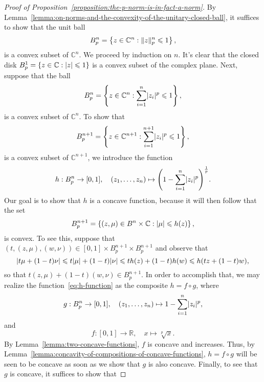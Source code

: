 \begin{proof}[Proof of Proposition~\ref{proposition:the-p-norm-is-in-fact-a-norm}]
  By Lemma~\ref{lemma:on-norms-and-the-convexity-of-the-unitary-closed-ball},
  it suffices to show that the unit ball
  \[
    B^{n}_{p}
    =
    \left\{z\in\mathbb{C}^{n}:\lVert z\rVert^{n}_{p}\leqslant{1}\right\},
  \]
  is a convex subset of \(\mathbb{C}^{n}\). We proceed by induction on
  \(n\). It's clear that the closed disk
  \(B^{1}_{p}=\left\{z\in\mathbb{C}:\lvert z\rvert\leqslant{1}\right\}\) is a
  convex subset of the complex plane. Next, suppose that the ball
  \[
    B^{n}_{p}
    =
    \left\{z\in\mathbb{C}^{n}:\sum_{i=1}^{n}\lvert z_{i}\rvert^{p}\leqslant{1}\right\},
  \]
  is a convex subset of \(\mathbb{C}^{n}\). To show that
  \[
    B^{n+1}_{p}
    =
    \left\{z\in\mathbb{C}^{n+1}:\sum_{i=1}^{n+1}\lvert z_{i}\rvert^{p}\leqslant{1}\right\},
  \]
  is a convex subset of \(\mathbb{C}^{n+1}\), we introduce the function
  \begin{equation}\label{eq:h-function}
    h:B^{n}_{p}\to{[0,1]},
    \quad{(z_{1},\ldots,z_{n})\mapsto\left(1-\sum_{i=1}^{n}\lvert z_{i}\rvert^{p}\right)^{\frac{1}{p}}}.
  \end{equation}
  Our goal is to show that \(h\) is a concave function, because it will then follow that
  the set
  \[
    B^{n+1}_{p}
    =
    \left\{(z,\mu)\in{B^{n}\times\mathbb{C}}:\lvert\mu\rvert\leqslant{h(z)}\right\},
  \]
  is convex. To see this, suppose that
  \((t,(z,\mu),(w,\nu))\in{[0,1]\times{B^{n+1}_{p}}\times{B^{n+1}_{p}}}\) and
  observe that
  \[
    \lvert t\mu+(1-t)\nu\rvert
    \leqslant{t\lvert\mu\rvert+(1-t)\lvert\nu\rvert}
    \leqslant{th(z)+(1-t)h(w)}
    \leqslant{h(tz+(1-t)w}),
  \]
  so that \(t(z,\mu)+(1-t)(w,\nu)\in{B^{n+1}_{p}}\). In order to accomplish
  that, we may realize the function~\eqref{eq:h-function} as the composite
  \(h=f\circ{g}\), where
  \begin{equation}\label{eq:g-function}
    g:B^{n}_{p}\to[0,1],
    \quad{(z_{1},\ldots,z_{n})\mapsto{1-\sum_{i=1}^{n}\lvert z_{i}\rvert^{p}}},
  \end{equation}
  and
  \begin{equation}\label{eq:f-function}
    f:[0,1]\to\mathbb{R},\quad{x\mapsto{\sqrt[p]{x}}}.
  \end{equation}
  By Lemma~\ref{lemma:two-concave-functions}, \(f\) is concave and increases.
  Thus, by Lemma~\ref{lemma:concavity-of-compositions-of-concave-functions},
  \(h=f\circ{g}\) will be seen to be concave as soon as we show that \(g\) is
  also concave. Finally, to see that \(g\) is concave, it suffices to show that

\end{proof}
